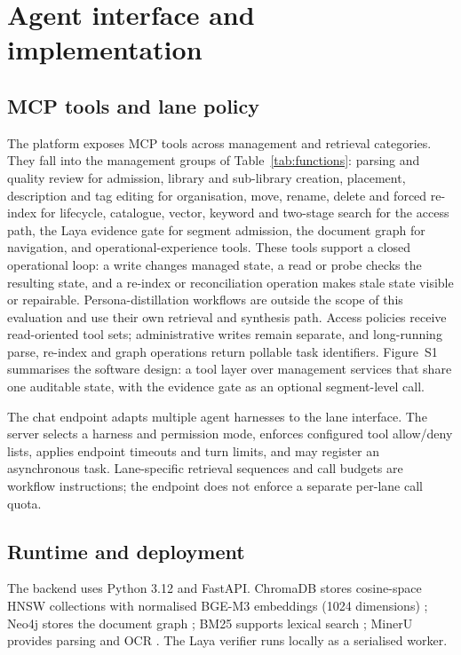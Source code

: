 \section{Agent interface and implementation}
\label{sec:implementation}
\label{sec:impl}

\subsection{MCP tools and lane policy}
\label{sec:impl-tools}

The platform exposes MCP tools across management and retrieval categories. They
fall into the management groups of Table~\ref{tab:functions}: parsing and
quality review for admission, library and sub-library creation, placement,
description and tag editing for organisation, move, rename, delete and forced
re-index for lifecycle, catalogue, vector, keyword and two-stage search for the
access path, the Laya evidence gate for segment admission, the document graph
for navigation, and operational-experience tools. These tools support a
closed operational loop: a write changes managed state, a read or probe checks
the resulting state, and a re-index or reconciliation operation makes stale
state visible or repairable. Persona-distillation workflows are outside the
scope of this evaluation and use their own retrieval and synthesis path.
Access policies receive read-oriented tool sets; administrative writes remain
separate, and long-running parse, re-index and graph operations return
pollable task identifiers. Figure~S1 summarises the software design: a tool
layer over management services that share one auditable state, with the
evidence gate as an optional segment-level call.



The chat endpoint adapts multiple agent harnesses to the lane interface. The
server selects a harness and permission mode, enforces configured tool
allow/deny lists, applies endpoint timeouts and turn limits, and may register an
asynchronous task. Lane-specific retrieval sequences and call budgets are
workflow instructions; the endpoint does not enforce a separate per-lane call
quota.

\subsection{Runtime and deployment}
\label{sec:impl-runtime}

The backend uses Python 3.12 and FastAPI. ChromaDB stores cosine-space HNSW
collections with normalised BGE-M3 embeddings (1024 dimensions)
\cite{chroma,hnsw,bge-m3}; Neo4j stores the document graph \cite{neo4j};
BM25 supports lexical search \cite{bm25}; MinerU provides parsing and OCR
\cite{mineru}. The Laya verifier runs locally as a serialised worker.


